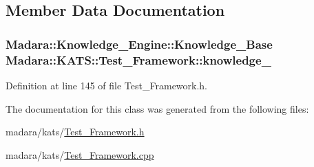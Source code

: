 \subsection{Member Data Documentation}
\hypertarget{classMadara_1_1KATS_1_1Test__Framework_a0459ab8366a35c7122770e331c22d416}{
\subsubsection[{knowledge\_\-}]{\setlength{\rightskip}{0pt plus 5cm}Madara::Knowledge\_\-Engine::Knowledge\_\-Base {\bf Madara::KATS::Test\_\-Framework::knowledge\_\-}}}
\label{de/dc6/classMadara_1_1KATS_1_1Test__Framework_a0459ab8366a35c7122770e331c22d416}


Definition at line 145 of file Test\_\-Framework.h.



The documentation for this class was generated from the following files:\begin{DoxyCompactItemize}
\item 
madara/kats/\hyperlink{Test__Framework_8h}{Test\_\-Framework.h}\item 
madara/kats/\hyperlink{Test__Framework_8cpp}{Test\_\-Framework.cpp}\end{DoxyCompactItemize}
